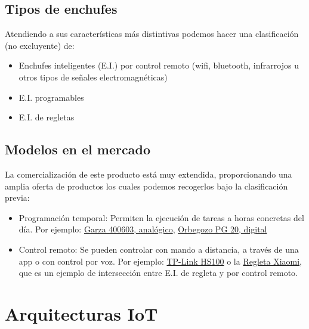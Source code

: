 \documentclass[a4paper,10pt]{article}
\begin{document}
\subsection{Tipos de enchufes}\label{tipos-de-enchufes}

Atendiendo a sus características más distintivas podemos hacer una
clasificación (no excluyente) de:

\begin{itemize}
\item
  Enchufes inteligentes (E.I.) por control remoto (wifi, bluetooth,
  infrarrojos u otros tipos de señales electromagnéticas)
\item
  E.I. programables
\item
  E.I. de regletas
\end{itemize}

\subsection{Modelos en el mercado}\label{modelos-en-el-mercado}

La comercialización de este producto está muy extendida, proporcionando
una amplia oferta de productos los cuales podemos recogerlos bajo la
clasificación previa:

\begin{itemize}
\item
  Programación temporal: Permiten la ejecución de tareas a horas
  concretas del día. Por ejemplo:
  \href{https://web.archive.org/web/20191111121153/https://www.amazon.es/Garza-Power-Temporizador-anal\%C3\%B3gico-programaci\%C3\%B3n/dp/B00URUVDW2/}{Garza
  400603, analógico},
  \href{https://web.archive.org/web/20191112121450/https://www.amazon.es/dp/B00ZJ1LQDK}{Orbegozo
  PG 20, digital}
\item
  Control remoto: Se pueden controlar con mando a distancia, a través de
  una app o con control por voz. Por ejemplo:
  \href{https://web.archive.org/web/20191112130933/https://www.amazon.es/dp/B06W586CDZ}{TP-Link
  HS100} o la
  \href{https://web.archive.org/web/20191116174434/https://www.amazon.es/dp/B07DJ2G1CW}{Regleta
  Xiaomi}, que es un ejemplo de intersección entre E.I. de regleta y por
  control remoto.
\end{itemize}

\newpage

\section{Arquitecturas IoT}\label{arquitecturas-iot}
\end{document}

